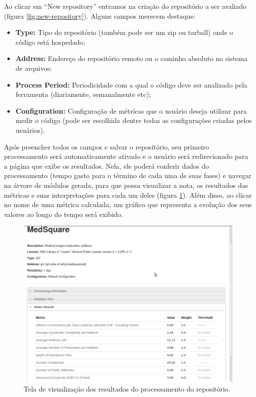 \documentclass{llncs}
\begin{document}
    Ao clicar em ``New repository'' entramos na criação do repositório a ser avaliado (figura \ref{fig:new-repository}). Alguns campos merecem destaque:
    \begin{itemize}
      \item\textbf{Type:} Tipo do repositório (também pode ser um zip ou tarball) onde o código está hospedado;
      \item\textbf{Address:} Endereço do repositório remoto ou o caminho absoluto no sistema de arquivos;
      \item\textbf{Process Period:} Periodicidade com a qual o código deve ser analizado pela ferramenta (diariamente, semanalmente etc);
      \item\textbf{Configuration:} Configuração de métricas que o usuário deseja utilizar para medir o código (pode ser escolhida dentre todas as configurações criadas pelos usuários).
    \end{itemize}
    Após preencher todos os campos e salvar o repositório, seu primeiro processamento será automaticamente ativado e o usuário será redirecionado para a página que exibe os resultados. Nela, ele poderá conferir dados do processamento (tempo gasto para o término de cada uma de suas fases) e navegar na árvore de módulos gerada, para que possa visualizar a nota, os resultados das métricas e suas interpretações para cada um deles (figura \ref{fig:results}). Além disso, ao clicar no nome de uma métrica calculada, um gráfico que representa a evolução dos seus valores ao longo do tempo será exibido.

    \begin{figure}[H]
      \centering
      \includegraphics[width=\textwidth]{images/new-repository-results.png}
      \caption{Tela de visualização dos resultados do processamento do repositório.}
      \label{fig:results}
    \end{figure}
\end{document}

